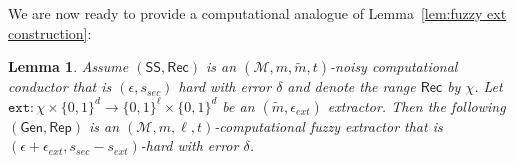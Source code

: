 \documentclass[11pt]{article}
\newcommand{\secref}[1]{\mbox{Section~\ref{#1}}}
\newcommand{\defref}[1]{\mbox{Definition~\ref{#1}}}
\newcommand{\lemref}[1]{\mbox{Lemma~\ref{#1}}}
\newcommand{\class}[1]{{\ensuremath{\mathsf{#1}}}}
\newcommand{\gen}{\ensuremath{\class{Gen}}\xspace}
\newcommand{\rep}{\ensuremath{\class{Rep}}\xspace}
\newcommand{\sketch}{\ensuremath{\class{SS}}\xspace}
\newcommand{\rec}{\ensuremath{\class{Rec}}\xspace}
\newcommand{\ext}{\ensuremath{\mathtt{ext}}}
\newcommand{\rext}{\ensuremath{\mathtt{rext}}}
\newtheorem{lemma}[theorem]{Lemma}
\begin{document}
We are now ready to provide a computational analogue of \lemref{lem:fuzzy ext construction}:
\begin{lemma}
Assume $(\sketch, \rec)$ is an $(\mathcal{M}, m, \tilde{m}, t)$-noisy computational conductor that is $(\epsilon, s_{sec})$ hard with error $\delta$ and denote the range $\rec$ by $\chi$.  Let $\ext:\chi \times \{0,1\}^d\rightarrow \{0,1\}^\ell \times \{0, 1\}^d$ be an $(\tilde{m}, \epsilon_{ext})$ extractor.  Then the following $(\gen , \rep)$ is an $(\mathcal{M}, m, \ell, t)$-computational fuzzy extractor that is $(\epsilon + \epsilon_{ext}, s_{sec}- s_{ext})$-hard with error $\delta$.
\end{lemma}
%
\end{document}
